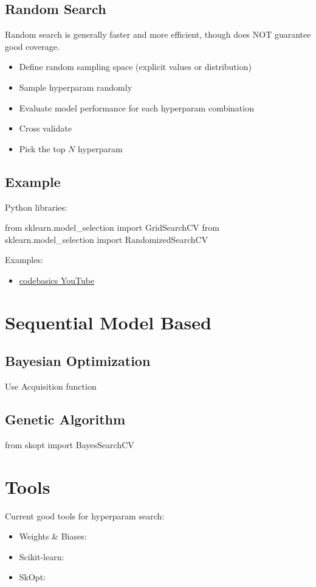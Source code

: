 \subsection{Random Search}
Random search is generally faster and more efficient, though does NOT guarantee good coverage.
\begin{itemize}
	\item Define random sampling space (explicit values or distribution)
	\item Sample hyper\ac{param} randomly
	\item Evaluate model performance for each hyper\ac{param} combination
	\item Cross validate
	\item Pick the top $N$ hyper\ac{param}
\end{itemize}

\subsection{Example}
Python libraries:
\begin{python}
from sklearn.model_selection import GridSearchCV
from sklearn.model_selection import RandomizedSearchCV
\end{python}

Examples:
\begin{itemize}
	\item \href{https://youtu.be/HdlDYng8g9s}{codebasics YouTube}
\end{itemize}

\section{Sequential Model Based}
\subsection{Bayesian Optimization}
Use Acquisition function \todo{}
\subsection{Genetic Algorithm}
\todo{}

\begin{python}
from skopt import BayesSearchCV
\end{python}

\section{Tools}
Current good tools for hyper\ac{param} search:
\begin{itemize}
	\item Weights \& Biases: 
	\item Scikit-learn: 
	\item SkOpt: 
\end{itemize}

